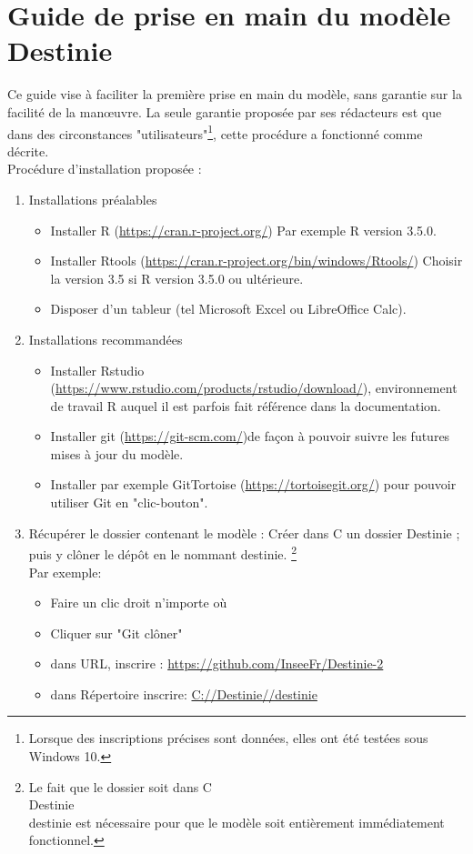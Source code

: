 \section{Guide de prise en main du modèle Destinie}

Ce guide vise à faciliter la première prise en main du modèle, sans garantie sur la facilité de la manœuvre. La seule garantie proposée par ses rédacteurs est que dans des circonstances "utilisateurs"\footnote{Lorsque des inscriptions précises sont données, elles ont été testées sous Windows 10.}, cette procédure a fonctionné comme décrite.\\

Procédure d'installation proposée :\\
\begin{enumerate}

\item Installations préalables 
\begin{itemize}
\item Installer	R (\url{https://cran.r-project.org/}) Par exemple R version 3.5.0.
\item Installer	Rtools (\url{https://cran.r-project.org/bin/windows/Rtools/}) Choisir la version 3.5 si R version 3.5.0 ou ultérieure.
\item Disposer d'un tableur (tel Microsoft Excel ou LibreOffice Calc).
\end{itemize}




\item Installations recommandées 
\begin{itemize}
\item Installer	Rstudio (\url{https://www.rstudio.com/products/rstudio/download/}), environnement de travail R auquel il est parfois fait référence dans la documentation.
\item Installer git (\url{https://git-scm.com/})de façon à pouvoir suivre les futures mises à jour du modèle.
\item Installer par exemple GitTortoise (\url{https://tortoisegit.org/}) pour pouvoir utiliser Git en "clic-bouton".
\end{itemize}

\item Récupérer le dossier contenant le modèle : 
Créer dans C  un dossier Destinie ; puis y clôner le dépôt en le nommant destinie. \footnote{Le fait que le dossier soit dans C\\Destinie\\destinie est nécessaire pour que le modèle soit entièrement immédiatement fonctionnel.} \\
Par exemple:
\begin{itemize}
\item Faire un clic droit n’importe où
\item Cliquer sur "Git clôner"
\item  dans URL, inscrire : \url{https://github.com/InseeFr/Destinie-2}
\item dans Répertoire inscrire: \url{C://Destinie//destinie}
\end{itemize}


\end{enumerate}
